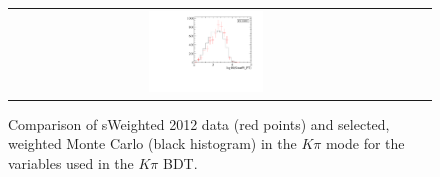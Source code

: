 \begin{figure}
\begin{tabular}{ccc}
\includegraphics[width=0.3\textwidth]{ANA_resources/Plots/Monte_carlo/data_vs_MC/weight/Kpi/log10(KstarPi_PT)_2012.pdf} & & \\
\end{tabular}
\caption{Comparison of sWeighted 2012 data (red points) and selected, weighted Monte Carlo (black histogram) in the $K\pi$ mode for the variables used in the $K\pi$ BDT.}
\label{fig:data_vs_MC_Kpi_2012}
\end{figure}
